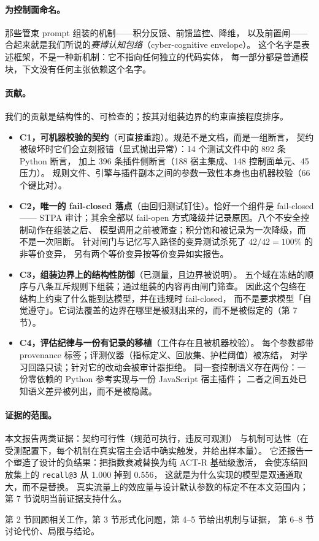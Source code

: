\paragraph{为控制面命名。} 那些管束 prompt 组装的机制——积分反馈、前馈监控、降维，
以及前置闸——合起来就是我们所说的\emph{赛博认知包络}（cyber-cognitive envelope）。
这个名字是表述框架，不是一种新机制：它不指向任何独立的代码实体，
每一部分都是普通模块，下文没有任何主张依赖这个名字。

\paragraph{贡献。} 我们的贡献是结构性的、可检查的；按其对组装边界的约束直接程度排序。

\begin{itemize}
\item \textbf{C1，可机器校验的契约}（可直接重跑）。规范不是文档，而是一组断言，
契约被破坏时它们会立刻报错（显式抛出异常）：14 个测试文件中的 892 条 Python 断言，
加上 396 条插件侧断言（188 宿主集成、148 控制面单元、45 压力）。
规则文件、引擎与插件副本之间的参数一致性本身也由机器校验（66 个键比对）。
\item \textbf{C2，唯一的 fail-closed 落点}（由回归测试钉住）。恰好一个组件是 fail-closed——
STPA 审计；其余全部以 fail-open 方式降级并记录原因。八个不安全控制动作在组装之后、
模型调用之前被筛查；积分饱和被记录为一次降级，而不是一次阻断。
针对闸门与记忆写入路径的变异测试杀死了 $42/42=100\%$ 的非等价变异，
另有两个等价变异按等价变异如实报告。
\item \textbf{C3，组装边界上的结构性防御}（已测量，且边界被说明）。
五个域在冻结的顺序与八条互斥规则下组装；通过组装的内容再由闸门筛查。
因此这个包络在结构上约束了什么能到达模型，并在违规时 fail-closed，
而不是要求模型「自觉遵守」。它词法覆盖的边界在哪里是被测出来的，而不是被假定的（第 7 节）。
\item \textbf{C4，评估纪律与一份有记录的移植}（工件存在且被机器校验）。
每个参数都带 provenance 标签；评测仪器（指标定义、回放集、护栏阈值）被冻结，
对学习回路只读；针对它的改动会被审计器拒绝。
同一套控制语义存在两份：一份零依赖的 Python 参考实现与一份 JavaScript 宿主插件；
二者之间五处已知语义差异被列出，而不是被隐藏。
\end{itemize}

\paragraph{证据的范围。} 本文报告两类证据：契约可行性（规范可执行，违反可观测）
与机制可达性（在受测配置下，每个机制在真实宿主会话中确实触发，并给出样本量）。
它还报告一个塑造了设计的负结果：把指数衰减替换为纯 ACT-R 基础级激活，
会使冻结回放集上的 \texttt{recall@3} 从 1.000 掉到 0.556，
这就是为什么实现的模型是双通道取大，而不是替换。
真实流量上的效应量与设计默认参数的标定不在本文范围内；第 7 节说明当前证据支持什么。

第 2 节回顾相关工作，第 3 节形式化问题，第 4–5 节给出机制与证据，
第 6–8 节讨论代价、局限与结论。
